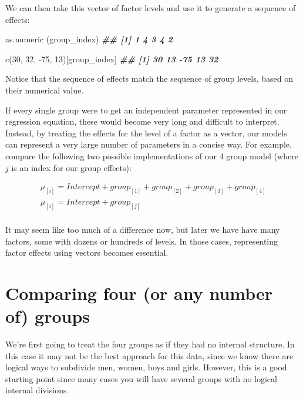 \documentclass[
]{book}
\newenvironment{Shaded}{\begin{snugshade}}{\end{snugshade}}
\newcommand{\DecValTok}[1]{\textcolor[rgb]{0.00,0.00,0.81}{#1}}
\newcommand{\DocumentationTok}[1]{\textcolor[rgb]{0.56,0.35,0.01}{\textbf{\textit{#1}}}}
\newcommand{\FunctionTok}[1]{\textcolor[rgb]{0.00,0.00,0.00}{#1}}
\newcommand{\NormalTok}[1]{#1}
\newcommand{\SpecialCharTok}[1]{\textcolor[rgb]{0.00,0.00,0.00}{#1}}
\begin{document}
We can then take this vector of factor levels and use it to generate a sequence of effects:

\begin{Shaded}
\begin{Highlighting}[]
\FunctionTok{as.numeric}\NormalTok{ (group\_index)}
\DocumentationTok{\#\# [1] 1 4 3 4 2}

\FunctionTok{c}\NormalTok{(}\DecValTok{30}\NormalTok{, }\DecValTok{32}\NormalTok{, }\SpecialCharTok{{-}}\DecValTok{75}\NormalTok{, }\DecValTok{13}\NormalTok{)[group\_index]}
\DocumentationTok{\#\# [1]  30  13 {-}75  13  32}
\end{Highlighting}
\end{Shaded}

Notice that the sequence of effects match the sequence of group levels, based on their numerical value.

If every single group were to get an independent parameter represented in our regression equation, these would become very long and difficult to interpret. Instead, by treating the effects for the level of a factor as a vector, our models can represent a very large number of parameters in a concise way. For example, compare the following two possible implementations of our 4 group model (where \(j\) is an index for our group effects):

\begin{equation}
\begin{split}
\mu_{[i]} = Intercept + group_{[1]} + group_{[2]} + group_{[3]} + group_{[4]} \\
\mu_{[i]} = Intercept + group_{[j]} \\
\end{split}
\label{eq:40}
\end{equation}

It may seem like too much of a difference now, but later we have have many factors, some with dozens or hundreds of levels. In those cases, representing factor effects using vectors becomes essential.

\hypertarget{comparing-four-or-any-number-of-groups}{%
\section{Comparing four (or any number of) groups}\label{comparing-four-or-any-number-of-groups}}

We're first going to treat the four groups as if they had no internal structure. In this case it may not be the best approach for this data, since we know there are logical ways to subdivide men, women, boys and girls. However, this is a good starting point since many cases you will have several groups with no logical internal divisions.
\end{document}
